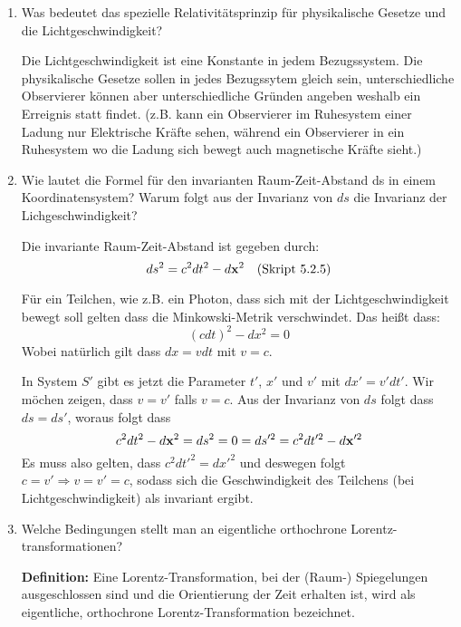 \begin{enumerate}
  \item Was bedeutet das spezielle Relativitätsprinzip für physikalische
    Gesetze und die Lichtgeschwindigkeit?

    Die Lichtgeschwindigkeit ist eine Konstante in jedem Bezugssystem.
    Die physikalische Gesetze sollen in jedes Bezugssytem gleich sein,
    unterschiedliche Observierer können aber unterschiedliche Gründen
    angeben weshalb ein Erreignis statt findet. (z.B. kann ein Observierer
    im Ruhesystem einer Ladung nur Elektrische Kräfte sehen, während
    ein Observierer in ein Ruhesystem wo die Ladung sich bewegt auch
    magnetische Kräfte sieht.) 

  \item Wie lautet die Formel für den invarianten Raum-Zeit-Abstand ds in
    einem Koordinatensystem? Warum folgt aus der Invarianz von $ds$ die
    Invarianz der Lichgeschwindigkeit?
    
    Die invariante Raum-Zeit-Abstand ist gegeben durch:
    \begin{equation*}
      ds^2 = c^2 dt^2 - d\vb x^2
      \quad\text{(Skript 5.2.5)}
    \end{equation*}

      Für ein Teilchen, wie z.B. ein Photon, dass sich mit der 
      Lichtgeschwindigkeit bewegt soll gelten dass die Minkowski-Metrik
      verschwindet. Das heißt dass:
      \begin{equation*}
        (cdt)^2 - dx^2 = 0 
      \end{equation*}
      Wobei natürlich gilt dass $dx=vdt$ mit $v=c$.

      In System $S'$ gibt es jetzt die Parameter $t'$, $x'$ und $v'$
      mit $dx'=v'dt'$. Wir möchen zeigen, dass $v=v'$ falls $v=c$.
      Aus der Invarianz von $ds$ folgt dass $ds=ds'$, woraus folgt dass
      \begin{equation*}
        c^2dt^2-d\vb x^2 = ds^2 = 0 = ds'^2 = c^2dt'^2 - d\vb x'^2
      \end{equation*}
      Es muss also gelten, dass $c^2dt'^2 = dx'^2$ und deswegen folgt
      $c=v'\Rightarrow v=v'=c$, sodass sich die Geschwindigkeit 
      des Teilchens (bei Lichtgeschwindigkeit) als invariant ergibt.

  \item Welche Bedingungen stellt man an eigentliche orthochrone
    Lorentz-transformationen?

    \textbf{Definition:} Eine Lorentz-Transformation, bei der (Raum-) 
    Spiegelungen 
    ausgeschlossen sind und die Orientierung der Zeit erhalten ist, 
    wird als eigentliche, orthochrone Lorentz-Transformation bezeichnet.


\end{enumerate}
